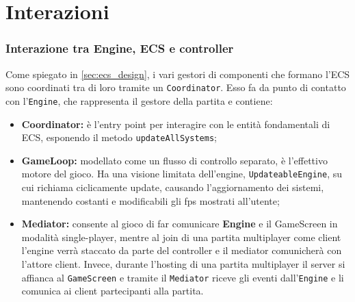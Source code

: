 \section{Interazioni}
\label{sec:interactions_design}

\subsubsection{Interazione tra Engine, ECS e controller}





Come spiegato in \ref{sec:ecs_design}, i vari gestori di componenti che formano l'ECS sono coordinati tra di loro tramite un \texttt{Coordinator}. Esso fa da punto di contatto con l'\texttt{Engine}, che rappresenta il gestore della partita e contiene:
\begin{itemize}
    \item \textbf{Coordinator:} è l'entry point per interagire con le entità fondamentali di ECS, esponendo il metodo \texttt{updateAllSystems};
    \item \textbf{GameLoop:} modellato come un flusso di controllo separato, è l'effettivo motore del gioco. Ha una visione limitata dell'engine, \texttt{UpdateableEngine}, su cui richiama ciclicamente update, causando l'aggiornamento dei sistemi, mantenendo costanti e modificabili gli fps mostrati all'utente;
    \item \textbf{Mediator:} consente al gioco di far comunicare \textbf{Engine} e il GameScreen in modalità single-player, mentre al join di una partita multiplayer come client l'engine verrà staccato da parte del controller e il mediator comunicherà con l'attore client. Invece, durante l'hosting di una partita multiplayer il server si affianca al \texttt{GameScreen} e tramite il \texttt{Mediator} riceve gli eventi dall'\texttt{Engine} e li comunica ai client partecipanti alla partita.
\end{itemize}

